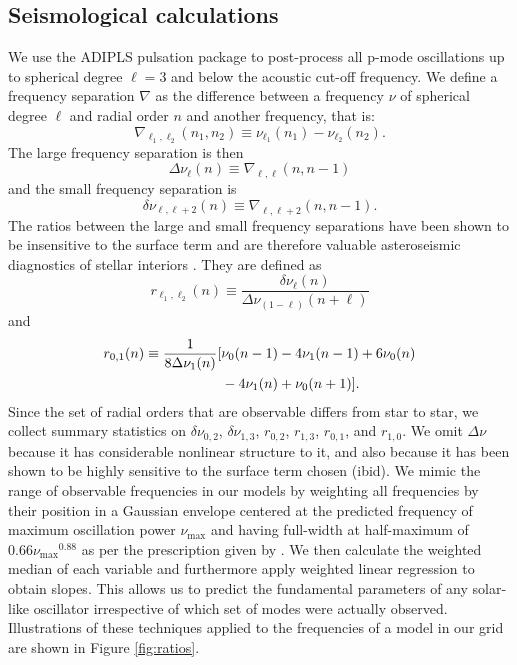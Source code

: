 \documentclass[manuscript]{aastex}
\begin{document}
\subsection{Seismological calculations}
\label{sec:seis}
We use the ADIPLS pulsation package \citep{2008Ap&SS.316..113C} to post-process all p-mode oscillations up to spherical degree $\ell=3$ and below the acoustic cut-off frequency. We define a frequency separation $\nabla$ as the difference between a frequency $\nu$ of spherical degree $\ell$ and radial order $n$ and another frequency, that is:
\begin{equation} 
  \nabla_{\ell_1, \ell_2}(n_1, n_2) \equiv \nu_{\ell_1}(n_1) - \nu_{\ell_2}(n_2).
\end{equation}
The large frequency separation is then
\begin{equation} 
  \Delta\nu_\ell(n) \equiv \nabla_{\ell, \ell}(n, n-1)
\end{equation}
and the small frequency separation is
\begin{equation}
  \delta\nu_{\ell, \ell+2}(n) \equiv \nabla_{\ell, \ell+2}(n, n-1).
\end{equation}
The ratios between the large and small frequency separations have been shown to be insensitive to the surface term and are therefore valuable asteroseismic diagnostics of stellar interiors \citep{2003A&A...411..215R}. They are defined as
\begin{equation} 
  r_{\ell_1,\ell_2}(n) \equiv \frac{\delta\nu_\ell(n)}{\Delta\nu_{(1-\ell)}(n+\ell)}
\end{equation}
and
\begin{align} 
  r_{0, 1}(n) \equiv \frac{1}{8\Delta\nu_{1}(n)} [&\nu_0(n-1) - 4\nu_1(n-1) + 6\nu_0(n) \notag\\
  & - 4\nu_1(n) + \nu_0(n+1)] .
\end{align}
Since the set of radial orders that are observable differs from star to star, we collect summary statistics on $\delta\nu_{0,2}$, $\delta\nu_{1,3}$, $r_{0,2}$, $r_{1,3}$, $r_{0,1}$, and $r_{1,0}$. We omit $\Delta\nu$ because it has considerable nonlinear structure to it, and also because it has been shown to be highly sensitive to the surface term chosen (ibid). We mimic the range of observable frequencies in our models by weighting all frequencies by their position in a Gaussian envelope centered at the predicted frequency of maximum oscillation power $\nu_{\max}$ and having full-width at half-maximum of $0.66\nu_{\max}{}^{0.88}$ as per the prescription given by \citet{2012A&A...537A..30M}. We then calculate the weighted median of each variable and furthermore apply weighted linear regression to obtain slopes. This allows us to predict the fundamental parameters of any solar-like oscillator irrespective of which set of modes were actually observed. Illustrations of these techniques applied to the frequencies of a model in our grid are shown in Figure \ref{fig:ratios}. 
\end{document}
